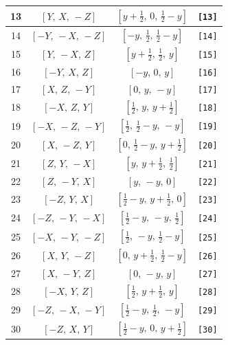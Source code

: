\documentclass[fleqn,8pt]{jsarticle}
\begin{document}
\begin{longtable}{cccc}
13 & $\left[ Y,\, X,\, - Z \right]$ & $\left[ y + \frac{1}{2},\, 0,\, \frac{1}{2} - y \right]$ & {\tt [13]} \\ \hline
14 & $\left[ - Y,\, - X,\, - Z \right]$ & $\left[ - y,\, \frac{1}{2},\, \frac{1}{2} - y \right]$ & {\tt [14]} \\ \hline
15 & $\left[ Y,\, - X,\, Z \right]$ & $\left[ y + \frac{1}{2},\, \frac{1}{2},\, y \right]$ & {\tt [15]} \\ \hline
16 & $\left[ - Y,\, X,\, Z \right]$ & $\left[ - y,\, 0,\, y \right]$ & {\tt [16]} \\ \hline
17 & $\left[ X,\, Z,\, - Y \right]$ & $\left[ 0,\, y,\, - y \right]$ & {\tt [17]} \\ \hline
18 & $\left[ - X,\, Z,\, Y \right]$ & $\left[ \frac{1}{2},\, y,\, y + \frac{1}{2} \right]$ & {\tt [18]} \\ \hline
19 & $\left[ - X,\, - Z,\, - Y \right]$ & $\left[ \frac{1}{2},\, \frac{1}{2} - y,\, - y \right]$ & {\tt [19]} \\ \hline
20 & $\left[ X,\, - Z,\, Y \right]$ & $\left[ 0,\, \frac{1}{2} - y,\, y + \frac{1}{2} \right]$ & {\tt [20]} \\ \hline
21 & $\left[ Z,\, Y,\, - X \right]$ & $\left[ y,\, y + \frac{1}{2},\, \frac{1}{2} \right]$ & {\tt [21]} \\ \hline
22 & $\left[ Z,\, - Y,\, X \right]$ & $\left[ y,\, - y,\, 0 \right]$ & {\tt [22]} \\ \hline
23 & $\left[ - Z,\, Y,\, X \right]$ & $\left[ \frac{1}{2} - y,\, y + \frac{1}{2},\, 0 \right]$ & {\tt [23]} \\ \hline
24 & $\left[ - Z,\, - Y,\, - X \right]$ & $\left[ \frac{1}{2} - y,\, - y,\, \frac{1}{2} \right]$ & {\tt [24]} \\ \hline
25 & $\left[ - X,\, - Y,\, - Z \right]$ & $\left[ \frac{1}{2},\, - y,\, \frac{1}{2} - y \right]$ & {\tt [25]} \\ \hline
26 & $\left[ X,\, Y,\, - Z \right]$ & $\left[ 0,\, y + \frac{1}{2},\, \frac{1}{2} - y \right]$ & {\tt [26]} \\ \hline
27 & $\left[ X,\, - Y,\, Z \right]$ & $\left[ 0,\, - y,\, y \right]$ & {\tt [27]} \\ \hline
28 & $\left[ - X,\, Y,\, Z \right]$ & $\left[ \frac{1}{2},\, y + \frac{1}{2},\, y \right]$ & {\tt [28]} \\ \hline
29 & $\left[ - Z,\, - X,\, - Y \right]$ & $\left[ \frac{1}{2} - y,\, \frac{1}{2},\, - y \right]$ & {\tt [29]} \\ \hline
30 & $\left[ - Z,\, X,\, Y \right]$ & $\left[ \frac{1}{2} - y,\, 0,\, y + \frac{1}{2} \right]$ & {\tt [30]} \\ \hline

\end{longtable}
\end{document}
